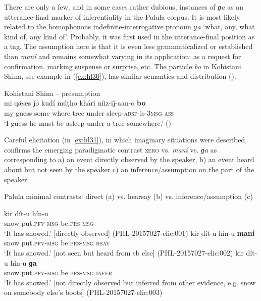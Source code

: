 \documentclass[output=paper]{langsci/langscibook}
\begin{document}
There are only a few, and in some cases rather dubious, instances of \textit{ɡa} as an utterance-final marker of inferentiality in the Palula corpus. It is most likely related to the homophonous indefinite-interrogative pronoun \textit{ɡa} ‘what, any, what kind of, any kind of’. Probably, it was first used in the utterance-final position as a tag. The assumption here is that it is even less grammaticalized or established than \textit{maní} and remains somewhat varying in its application: as a request for confirmation, marking suspense or surprise, etc. The particle \textit{bo} in Kohistani Shina, see example in ‎(\ref{ex:hl30}), has similar semantics and distribution (\citealt[204]{SchmidtKohistani2008}).

\begin{exe}
\ex Kohistani Shina -- presumption \label{ex:hl30}\\
	\gll mi qǽæs ǰo kudí múṭho khári níiz-iǰ-aan-o \textbf{bo}\\
	my guess some where tree under sleep-\textsc{absp}-is-3\textsc{msg} \textsc{ass}\\
	\trans ‘I guess he must be asleep under a tree somewhere.’ (\citealt[204]{SchmidtKohistani2008})
\end{exe}

Careful elicitation (in ‎\ref{ex:hl31}), in which imaginary situations were described, confirms the emerging paradigmatic contrast \textsc{zero} vs. \textit{maní} vs. \textit{ɡa} as corresponding to a) an event directly observed by the speaker, b) an event heard about but not seen by the speaker c) an inference/assumption on the part of the speaker.

\begin{exe}
\ex Palula minimal contrastsː direct (a) vs. hearsay (b) vs. inference/assumption (c) \label{ex:hl31}
	\begin{xlist}
	\ex 
	\gll kir  dít-u hín-u\\
	snow put.\textsc{pfv}-\textsc{msg} be.\textsc{prs}-\textsc{msg}\\
	\trans ‘It has snowed.’ [directly observed] (PHL-20157027-elic:001)
	\ex 
	\gll kir dít-u hín-u \textbf{maní}\\
	snow put.\textsc{pfv}-\textsc{msg} be.\textsc{prs}-\textsc{msg} \textsc{hsay}\\
	\trans ‘It has snowed.’ [not seen but heard from sb else] (PHL-20157027-elic:002)
	\ex 
	\gll kir dít-u hín-u \textbf{ɡa}\\
	snow {put.\textsc{pfv-msg}} {be.\textsc{prs-msg}} {\textsc{infer}}\\
	\trans ‘It has snowed.’ [not directly observed but inferred from other evidence, e.g. snow on somebody else’s boots] (PHL-20157027-elic:003)
	\end{xlist}
\end{exe}
\end{document}
